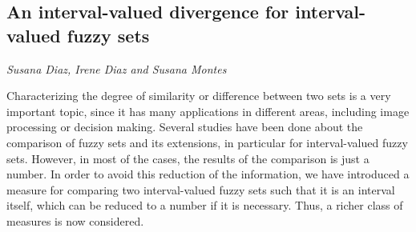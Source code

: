 \documentclass[../booklet.tex]{subfiles}
\begin{document}
\subsection[An interval-valued divergence for interval-valued fuzzy sets. {\it Susana Diaz, Irene Diaz and Susana Montes}]{An interval-valued divergence for interval-valued fuzzy sets}
  

\begin{center}
  {\it Susana Diaz, Irene Diaz and Susana Montes}
\end{center}



Characterizing the degree of similarity or difference between two sets is a very important topic, since it has many applications in different areas, including image processing or decision making. Several studies have been done about the comparison of fuzzy sets and its extensions, in particular for interval-valued fuzzy sets. However, in most of the cases, the results of the comparison is just a number. In order to avoid this reduction of the information, we have introduced a measure for comparing two interval-valued fuzzy sets such that it is an interval itself, which can be reduced to a number if it is  necessary. Thus,  a richer class of measures is now considered.

\end{document}
